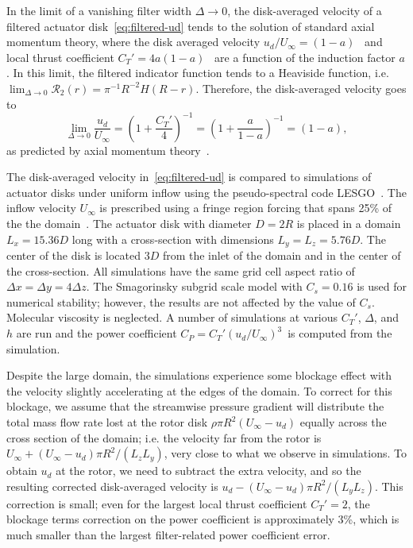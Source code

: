 \documentclass{article}
\begin{document}
In the limit of a vanishing filter width $\Delta \rightarrow 0$, the disk-averaged velocity of a filtered actuator disk~\eqref{eq:filtered-ud} tends to the solution of standard axial momentum theory, where the disk averaged velocity $u_d / U_\infty = (1-a)$~\cite{Burton2011a} and local thrust coefficient $C_T' = 4a(1-a)$~\cite{Calaf2010a, Meyers2010a} are a function of the induction factor $a$. In this limit, the filtered indicator function tends to a Heaviside function, i.e. $\lim_{\Delta \rightarrow 0} \mathcal{R}_2(r) = \pi^{-1}R^{-2}H(R-r)$. Therefore, the disk-averaged velocity goes to
\begin{equation}
\lim_{\Delta \rightarrow 0} \frac{u_d}{U_\infty} =\left( 1 + \frac{C_T'}{4}\right)^{-1} = \left( 1 + \frac{a}{1-a}\right)^{-1} = (1-a),
\end{equation}
as predicted by axial momentum theory~\cite{Burton2011a}. 

The disk-averaged velocity in~\eqref{eq:filtered-ud} is compared to simulations of actuator disks under uniform inflow using the pseudo-spectral code LESGO~\cite{Stevens2018a}. The inflow velocity $U_\infty$ is prescribed using a fringe region forcing that spans 25\% of the the domain~\cite{Stevens2014a}. The actuator disk with diameter $D=2R$ is placed in a domain $L_x = 15.36D$ long with a cross-section with dimensions $L_y = L_z = 5.76D$. The center of the disk is located $3D$ from the inlet of the domain and in the center of the cross-section. All simulations have the same grid cell aspect ratio of $\Delta x=\Delta y = 4\Delta z$. The Smagorinsky subgrid scale model with $C_s = 0.16$ is used for numerical stability; however, the results are not affected by the value of $C_s$. Molecular viscosity is neglected. A number of simulations at various $C_T'$, $\Delta$, and $h$ are run and the power coefficient $C_P = C_T' (u_d/U_\infty)^3$\,\cite{Meyers2010a} is computed from the simulation.

Despite the large domain, the simulations experience some blockage effect with the velocity slightly accelerating at the edges of the domain. To correct for this blockage, we assume that the streamwise pressure gradient will distribute the total mass flow rate lost at the rotor disk $\rho  \pi R^2 (U_\infty - u_d)$ equally across the cross section of the domain; i.e. the velocity far from the rotor is $U_\infty + (U_\infty-u_d) \pi R^2/(L_zL_y)$, very close to what we observe in simulations. To obtain $u_d$ at the rotor, we need to subtract the extra velocity, and so the resulting corrected disk-averaged velocity is $u_d - (U_\infty - u_d) \pi R^2/(L_yL_z)$. This correction is small; even for the largest local thrust coefficient $C_T'=2$, the blockage terms correction on the power coefficient is approximately 3\%, which is much smaller than the largest filter-related power coefficient error.
\end{document}
